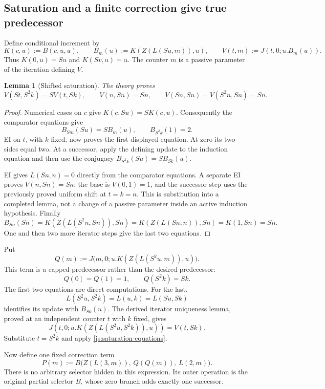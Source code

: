 \documentclass[11pt,letterpaper]{article}
\newtheorem{lemma}[theorem]{Lemma}
\theoremstyle{definition}\newtheorem{definition}[theorem]{Definition}
\theoremstyle{remark}\newtheorem{remark}[theorem]{Remark}
\begin{document}
\subsection{Saturation and a finite correction give true predecessor}

Define conditional increment by
\[
 K(c,u):=B(c,u,u),\qquad
 B_m(u):=K(Z(L(Su,m)),u),\qquad
 V(t,m):=J(t,0;u.B_m(u)).
\]
Thus $K(0,u)=Su$ and $K(Sv,u)=u$.  The counter $m$ is a passive
parameter of the iteration defining $V$.

\begin{lemma}[Shifted saturation]\label{js:saturation}
The theory proves
\[
 V(St,S^2k)=S V(t,Sk),\qquad
 V(n,Sn)=Sn,\qquad
 V(Sn,Sn)=V(S^2n,Sn)=Sn.
 \tag{Saturation}\label{js:saturation-equations}
\]
\end{lemma}
\begin{proof}
Numerical cases on $c$ give $K(c,Su)=S K(c,u)$.  Consequently
the comparator equations give
\[
 B_{Sm}(Su)=S B_m(u),\qquad B_{S^2k}(1)=2.
\]
EI on $t$, with $k$ fixed, now proves the first displayed equation.
At zero its two sides equal two.  At a successor, apply the defining
update to the induction equation and then use the conjugacy
$B_{S^2k}(Su)=S B_{Sk}(u)$.

EI gives $L(Sn,n)=0$ directly from the comparator equations.
A separate EI proves $V(n,Sn)=Sn$: the base is $V(0,1)=1$,
and the successor step uses the previously proved uniform shift at
$t=k=n$.  This is substitution into a completed lemma, not a change
of a passive parameter inside an active induction hypothesis.
Finally
\[
 B_{Sn}(Sn)=K(Z(L(S^2n,Sn)),Sn)
           =K(Z(L(Sn,n)),Sn)=K(1,Sn)=Sn.
\]
One and then two more iterator steps give the last two equations.
\end{proof}

Put
\[
 Q(m):=J\bigl(m,0;u.K(Z(L(S^2u,m)),u)\bigr).
\]
This term is a capped predecessor rather than the desired predecessor:
\[
 Q(0)=Q(1)=1,\qquad Q(S^2k)=Sk.
 \tag{Capped predecessor}\label{js:capped}
\]
The first two equations are direct computations.  For the last,
\[
 L(S^2u,S^2k)=L(u,k)=L(Su,Sk)
\]
identifies its update with $B_{Sk}(u)$.  The derived iterator uniqueness
lemma, proved at an independent counter $t$ with $k$ fixed, gives
\[
 J(t,0;u.K(Z(L(S^2u,S^2k)),u))=V(t,Sk).
\]
Substitute $t=S^2k$ and apply \eqref{js:saturation-equations}.

Now define one fixed correction term
\[
 \boxed{\quad
 P(m):=B\bigl(Z(L(3,m)),\ Q(Q(m)),\ L(2,m)\bigr).
 \quad}\tag{Predecessor}\label{js:predecessor}
\]
There is no arbitrary selector hidden in this expression.  Its outer
operation is the original partial selector $B$, whose zero branch adds
exactly one successor.
\end{document}
